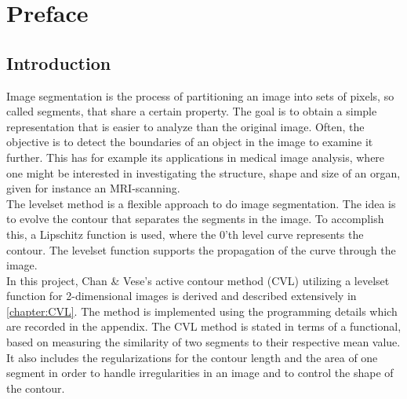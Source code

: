 
\chapter{Preface}\label{chapter:preface}
\section{Introduction}
Image segmentation is the process of partitioning an image into sets of pixels, so called segments, that share a certain property. The goal is to obtain a simple representation that is easier to analyze than the original image. Often, the objective is to detect the boundaries of an object in the image to examine it further. This has for example its applications in medical image analysis, where one might be interested in investigating the structure, shape and size of an organ, given for instance an MRI-scanning.\\

The levelset method is a flexible approach to do image segmentation. The idea is to evolve the contour that separates the segments in the image. To accomplish this, a Lipschitz function is used, where the 0'th level curve represents the contour. The levelset function supports the propagation of the curve through the image.\\

In this project, Chan \& Vese's active contour method (CVL) \cite{chan.01} utilizing a levelset function for 2-dimensional images is derived and described extensively in \cref{chapter:CVL}. The method is implemented using the programming details which are recorded in the appendix. The CVL method is stated in terms of a functional, based on measuring the similarity of two segments to their respective mean value. It also includes the regularizations for the contour length and the area of one segment in order to handle irregularities in an image and to control the shape of the contour.\\

